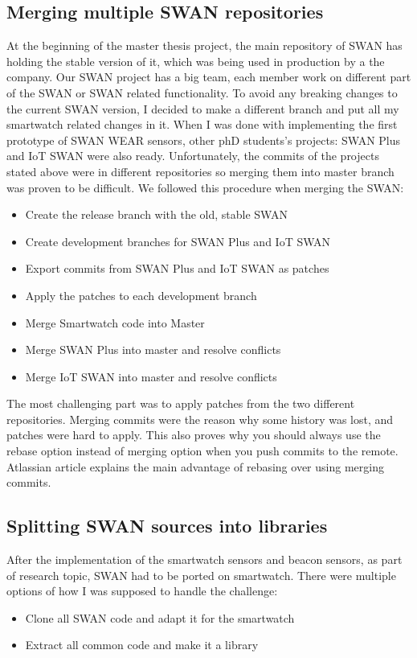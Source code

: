 \subsection{Merging multiple SWAN repositories}
At the beginning of the master thesis project, the main repository of SWAN has holding the stable version of it, which was being used in production 
by a the company. Our SWAN project has a big team, each member work on different part of the SWAN or SWAN related functionality.
To avoid any breaking changes to the current SWAN version, I decided to make a different branch and put all my smartwatch related changes in it.
When I was done with implementing the first prototype of SWAN WEAR sensors, other phD students's projects: SWAN Plus and IoT SWAN were also ready.
Unfortunately, the commits of the projects stated above were in different repositories so merging them into master branch was proven to be difficult.
We followed this procedure when merging the SWAN:
\begin{itemize}
 \item Create the release branch with the old, stable SWAN
 \item Create development branches for SWAN Plus and IoT SWAN
 \item Export commits from SWAN Plus and IoT SWAN as patches
 \item Apply the patches to each development branch
 \item Merge Smartwatch code into Master
 \item Merge SWAN Plus into master and resolve conflicts
 \item Merge IoT SWAN into master and resolve conflicts
\end{itemize}

The most challenging part was to apply patches from the two different repositories. Merging commits were the reason why some history was 
lost, and patches were hard to apply. This also proves why you should always use the rebase option instead of merging option when you push commits
to the remote. Atlassian article\cite{atlassian_merge_rebase} explains the main advantage of rebasing over using merging commits.

\subsection{Splitting SWAN sources into libraries}\label{scc:swan_split}
After the implementation of the smartwatch sensors and beacon sensors, as part of research topic, SWAN had to be ported on smartwatch.
There were multiple options of how I was supposed to handle the challenge:
\begin{itemize}
 \item Clone all SWAN code and adapt it for the smartwatch
 \item Extract all common code and make it a library
\end{itemize}

